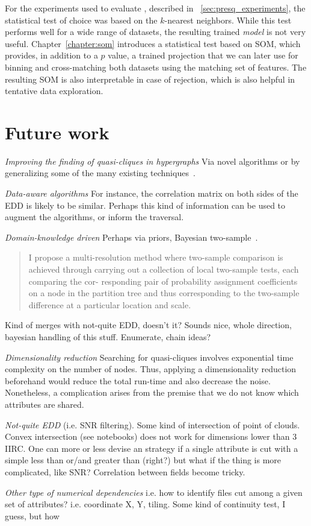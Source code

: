 For the experiments used to evaluate \PresQ, described in ~\ref{sec:presq_experiments},
the statistical test of choice was based on the $k$-nearest neighbors. While this test
performs well for a wide range of datasets, the resulting trained \emph{model} is not
very useful.
Chapter~\ref{chapter:som} introduces a statistical test based on \gls{SOM}, which provides,
in addition to a $p$ value, a trained projection that we can later use for binning and
cross-matching both datasets using the matching set of features. The resulting \gls{SOM}
is also interpretable in case of rejection, which is also helpful in tentative data exploration.

\section{Future work}

\emph{Improving the finding of quasi-cliques in hypergraphs} Via novel algorithms
    or by generalizing some of the many existing techniques~\cite{WU2015693}.

\emph{Data-aware algorithms} For instance, the correlation matrix on both sides of
    the \gls{EDD} is likely to be similar. Perhaps this kind of information can be used to
    augment the algorithms, or inform the traversal.
    
\emph{Domain-knowledge driven} Perhaps via priors, Bayesian two-sample~\cite{soriano2015bayesian}.
\begin{quote}
I propose a multi-resolution method where two-sample comparison is achieved
through carrying out a collection of local two-sample tests, each comparing the cor-
responding pair of probability assignment coefficients on a node in the partition tree
and thus corresponding to the two-sample difference at a particular location and
scale.
\end{quote}
Kind of merges with not-quite EDD, doesn't it? Sounds nice, whole direction, bayesian handling of this stuff.
Enumerate, chain ideas?

\emph{Dimensionality reduction} Searching for quasi-cliques involves exponential
    time complexity on the number of nodes. Thus, applying a dimensionality reduction beforehand
    would reduce the total run-time and also decrease the noise. Nonetheless, a complication
    arises from the premise that we do not know which attributes are shared.

\emph{Not-quite EDD} (i.e. SNR filtering). Some kind of intersection of point of clouds. Convex
    intersection (see notebooks) does not work for dimensions lower than 3 IIRC.
    One can more or less devise an strategy if a single attribute is cut with a simple
    less than or/and greater than (right?) but what if the thing is more complicated,
    like SNR? Correlation between fields become tricky.

\emph{Other type of numerical dependencies} i.e. how to identify files cut among a
    given set of attributes? i.e. coordinate X, Y, tiling. Some kind of continuity test, I guess,
    but how 